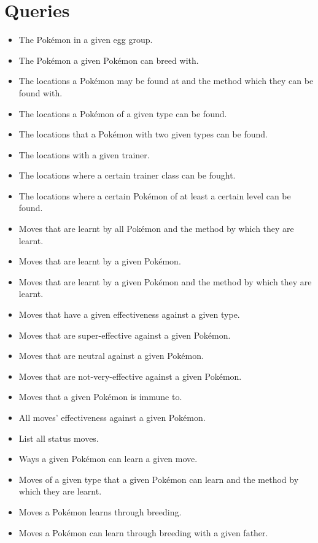 \documentclass{article}
\begin{document}
\section{Queries}
\begin{itemize}
    \item The Pok\'emon in a given egg group.
    \item The Pok\'emon a given Pok\'emon can breed with.
    \item The locations a Pok\'emon may be found at and the method which they can be found with.
    \item The locations a Pok\'emon of a given type can be found.
    \item The locations that a Pok\'emon with two given types can be found.
    \item The locations with a given trainer.
    \item The locations where a certain trainer class can be fought.
    \item The locations where a certain Pok\'emon of at least a certain level can be found.
    \item Moves that are learnt by all Pok\'emon and the method by which they are learnt.
    \item Moves that are learnt by a given Pok\'emon.
    \item Moves that are learnt by a given Pok\'emon and the method by which they are learnt.
    \item Moves that have a given effectiveness against a given type.
    \item Moves that are super-effective against a given Pok\'emon.
    \item Moves that are neutral against a given Pok\'emon.
    \item Moves that are not-very-effective against a given Pok\'emon.
    \item Moves that a given Pok\'emon is immune to.
    \item All moves' effectiveness against a given Pok\'emon.
    \item List all status moves.
    \item Ways a given Pok\'emon can learn a given move.
    \item Moves of a given type that a given Pok\'emon can learn and the method by which they are
        learnt.
    \item Moves a Pok\'emon learns through breeding.
    \item Moves a Pok\'emon can learn through breeding with a given father.

\end{itemize}
\end{document}
